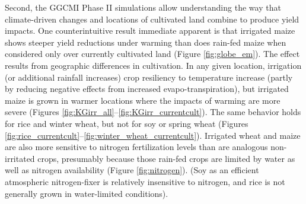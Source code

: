\documentclass[esd, final]{copernicus} %
\begin{document}
Second, the GGCMI Phase II simulations allow understanding the way that climate-driven changes and locations of cultivated land combine to produce yield impacts. One counterintuitive result immediate apparent is that irrigated maize shows steeper yield reductions under warming than does rain-fed maize when considered only over currently cultivated land (Figure \ref{fig:globe_em}). The effect results from geographic differences in cultivation. In any given location, irrigation (or additional rainfall increases) crop resiliency to temperature increase (partly by reducing negative effects from increased evapo-transpiration), but irrigated maize is grown in warmer locations where the impacts of warming are more severe (Figures \ref{fig:KGirr_all}--\ref{fig:KGirr_currentcult}). The same behavior holds for rice and winter wheat, but not for soy or spring wheat (Figures \ref{fig:rice_currentcult}--\ref{fig:winter_wheat_currentcult}). Irrigated wheat and maize are also more sensitive to nitrogen fertilization levels than are analogous non-irritated crops, presumably because those rain-fed crops are limited by water as well as nitrogen availability (Figure \ref{fig:nitrogen}). (Soy as an efficient atmospheric nitrogen-fixer is relatively insensitive to nitrogen, and rice is not generally grown in water-limited conditions).
\end{document}
